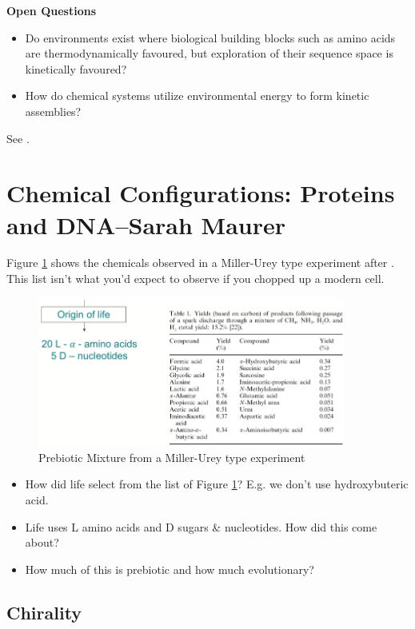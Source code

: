 \documentclass[]{article}
\begin{document}
\textbf{Open Questions}
\begin{itemize}
	\item Do environments exist where biological building blocks such as amino acids are
	thermodynamically favoured, but exploration of their sequence space is kinetically favoured?
	\item How do chemical systems utilize environmental energy to form kinetic assemblies?
\end{itemize}

See \cite{pross2017and,semenov2016autocatalytic,pross2008can,pross2005emergence}.

\section[Chemical Configurations: Proteins and DNA]{Chemical Configurations: Proteins and DNA--Sarah Maurer}

Figure \ref{fig:PrebioticMix} shows the chemicals observed in a Miller-Urey type experiment after \cite{podlech2001origin}. This list isn't what you'd expect to observe if you chopped up a modern cell.
\begin{figure}[H]
	\caption{Prebiotic Mixture from a Miller-Urey type experiment} \label{fig:PrebioticMix} 
	\includegraphics[width=0.9\textwidth]{PrebioticMix}
\end{figure}

\begin{itemize}
	\item How did life select from the list of Figure \ref{fig:PrebioticMix}? E.g. we don't use hydroxybuteric acid.
	\item Life uses L amino acids and D sugars \& nucleotides. How did this come about?
	\item How much of this is prebiotic and how much evolutionary? 
\end{itemize}

\subsection{Chirality}
\end{document}
